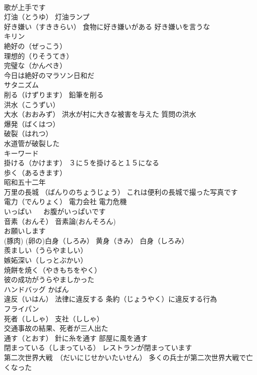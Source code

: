 \documentclass[8pt]{extreport}
\begin{document}
\begin{CJK}{UTF8}{min}
\\	歌が上手です
\\	灯油（とうゆ） 灯油ランプ
\\	好き嫌い（すききらい） 食物に好き嫌いがある 好き嫌いを言うな
\\	キリン
\\	絶好の（ぜっこう）
\\	理想的（りそうてき）
\\	完璧な（かんぺき）
\\	今日は絶好のマラソン日和だ
\\	サタニズム
\\	削る（けずります） 鉛筆を削る
\\	洪水（こうずい）
\\	大水（おおみず） 洪水が村に大きな被害を与えた 質問の洪水
\\	爆発（ばくはつ）
\\	破裂（はれつ）
\\	水道管が破裂した
\\	キーワード
\\	掛ける（かけます） ３に５を掛けると１５になる
\\	歩く（あるきます）
\\	昭和五十二年 
\\	万里の長城 （ばんりのちょうじょう） これは便利の長城で撮った写真です
\\	電力（でんりょく） 電力会社 電力危機
\\	いっぱい 　 お腹がいっぱいです
\\	音素（おんそ） 音素論(おんそろん)
\\	お願いします
\\	(豚肉)	(卵の)白身（しろみ） 黄身（きみ） 白身（しろみ）
\\	羨ましい（うらやましい）
\\	嫉妬深い（しっとぶかい）
\\	焼餅を焼く（やきもちをやく）
\\	彼の成功がうらやましかった
\\	ハンドバッグ かばん
\\	違反（いはん） 法律に違反する 条約（じょうやく）に違反する行為
\\	フライパン
\\	死者（ししゃ） 支社（ししゃ）
\\	交通事故の結果、死者が三人出た
\\	通す（とおす） 針に糸を通す 部屋に風を通す
\\	閉まっている（しまっている） レストランが閉まっています
\\	第二次世界大戦　（だいにじせかいたいせん） 多くの兵士が第二次世界大戦で亡くなった

\end{CJK}
\end{document}
